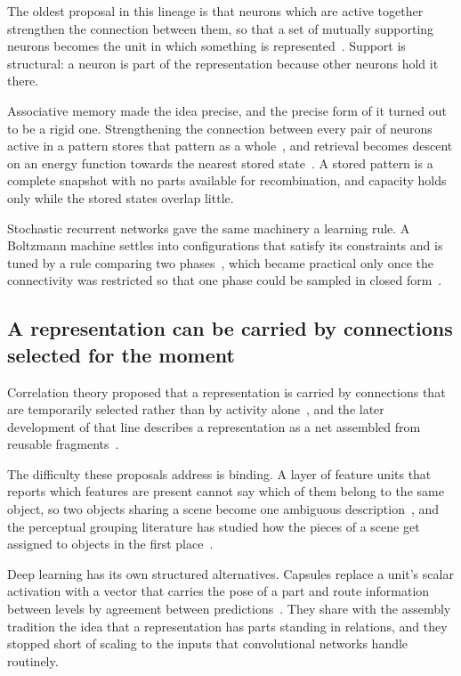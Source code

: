 The oldest proposal in this lineage is that neurons which are active together
strengthen the connection between them, so that a set of mutually supporting
neurons becomes the unit in which something is
represented~\cite{hebb_organization_1949}. Support is structural: a neuron is
part of the representation because other neurons hold it there.

Associative memory made the idea precise, and the precise form of it turned
out to be a rigid one. Strengthening the connection between every pair of neurons active in a pattern
stores that pattern as a whole~\cite{amari_learning_1972}, and retrieval
becomes descent on an energy function towards the nearest stored
state~\cite{hopfield_neural_1982}. A stored pattern is a complete snapshot
with no parts available for recombination, and capacity holds only while the
stored states overlap little.

Stochastic recurrent networks gave the same machinery a learning rule.
A Boltzmann machine settles into configurations that satisfy its constraints
and is tuned by a rule comparing two
phases~\cite{etal_boltzmann_1984, smolensky_information_1987}, which became
practical only once the connectivity was restricted so that one phase could be
sampled in closed form~\cite{hinton_reducing_2006}.

\subsection{A representation can be carried by connections selected for the moment}
\label{sec:bg_binding}

Correlation theory proposed that a representation is carried by connections
that are temporarily selected rather than by activity
alone~\cite{malsburg_correlation_1981}, and the later development of that
line describes a representation as a net assembled from reusable
fragments~\cite{malsburg_concerning_2018}.

The difficulty these proposals address is binding. A layer of feature units
that reports which features are present cannot say which of them belong to the
same object, so two objects sharing a scene become one ambiguous
description~\cite{etal_binding_2020}, and the perceptual grouping literature
has studied how the pieces of a scene get assigned to objects in the first
place~\cite{etal_century_2012}.

Deep learning has its own structured alternatives. Capsules replace a unit's
scalar activation with a vector that carries the pose of a part and route
information between levels by agreement between
predictions~\cite{hinton_transforming_2011, sabour_dynamic_2017}. They share
with the assembly tradition the idea that a representation has parts standing
in relations, and they stopped short of scaling to the inputs that
convolutional networks handle routinely.


